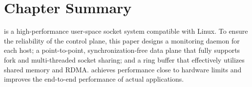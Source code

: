 \section{Chapter Summary}
\label{socksdirect:sec:conclusion}

\sys {} is a high-performance user-space socket system compatible with Linux. To ensure the reliability of the control plane, this paper designs a monitoring daemon for each host; a point-to-point, synchronization-free data plane that fully supports fork and multi-threaded socket sharing; and a ring buffer that effectively utilizes shared memory and RDMA. \sys {} achieves performance close to hardware limits and improves the end-to-end performance of actual applications.

